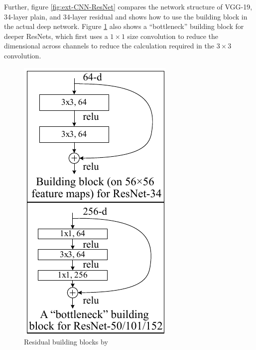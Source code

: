 Further, figure \ref{fig:ext-CNN-ResNet} compares the network structure of VGG-19, 34-layer plain, and 34-layer residual and shows how to use the building block in the actual deep network. 
Figure \ref{fig:ext-CNN-ResNet-BBs} also shows a ``bottleneck'' building block for deeper ResNets, which first uses a $1\times1$ size convolution to reduce the dimensional across channels to reduce the calculation required in the $3\times3$ convolution.

\begin{minipage}[ht]{.32\textwidth}
    \begin{figure}[H]
        \centering
    \includegraphics[width=.99\textwidth]{literature/imgs/ext-CNN-ResNet-BBs.pdf}
    \caption{Residual building blocks by \citet{he2015deep}}
    \label{fig:ext-CNN-ResNet-BBs}
    \end{figure}
\end{minipage}
